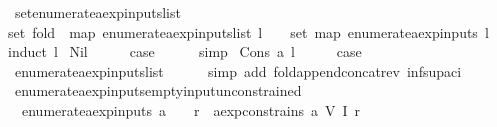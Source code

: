 \begin{isabellebody}
%
\isadelimproof
\isanewline
%
\endisadelimproof
\isanewline
{}\isamarkupfalse%
\ set{\isacharunderscore}enumerate{\isacharunderscore}aexp{\isacharunderscore}inputs{\isacharunderscore}list{\isacharcolon}\ \isanewline
{\isachardoublequoteopen}set\ {\isacharparenleft}fold\ {\isacharparenleft}{\isacharat}{\isacharparenright}\ {\isacharparenleft}map\ enumerate{\isacharunderscore}aexp{\isacharunderscore}inputs{\isacharunderscore}list\ l{\isacharparenright}\ {\isacharbrackleft}{\isacharbrackright}{\isacharparenright}\ {\isacharequal}\ {\isacharparenleft}{\isasymUnion}\ {\isacharparenleft}set\ {\isacharparenleft}map\ enumerate{\isacharunderscore}aexp{\isacharunderscore}inputs\ l{\isacharparenright}{\isacharparenright}{\isacharparenright}{\isachardoublequoteclose}\isanewline
%
\isadelimproof
%
\endisadelimproof
%
\isatagproof
{}\isamarkupfalse%
{\isacharparenleft}induct\ l{\isacharparenright}\isanewline
{}\isamarkupfalse%
\ Nil\isanewline
\ \ \isamarkupfalse%
\ \isamarkupfalse%
\ {\isacharquery}case\isanewline
\ \ \ \ \isamarkupfalse%
\ simp\isanewline
{}\isamarkupfalse%
\isanewline
{}\isamarkupfalse%
\ {\isacharparenleft}Cons\ a\ l{\isacharparenright}\isanewline
\ \ \isamarkupfalse%
\ \isamarkupfalse%
\ {\isacharquery}case\isanewline
\ \ \ \ \isamarkupfalse%
\ enumerate{\isacharunderscore}aexp{\isacharunderscore}inputs{\isacharunderscore}list\isanewline
\ \ \ \ \isamarkupfalse%
\ {\isacharparenleft}simp\ add{\isacharcolon}\ fold{\isacharunderscore}append{\isacharunderscore}concat{\isacharunderscore}rev\ inf{\isacharunderscore}sup{\isacharunderscore}aci{\isacharparenleft}{}{\isacharparenright}{\isacharparenright}\isanewline
{}\isamarkupfalse%
%
\endisatagproof
{\isafoldproof}%
%
\isadelimproof
\isanewline
%
\endisadelimproof
\isanewline
{}\isamarkupfalse%
\ enumerate{\isacharunderscore}aexp{\isacharunderscore}inputs{\isacharunderscore}empty{\isacharunderscore}input{\isacharunderscore}unconstrained{\isacharcolon}\isanewline
\ \ {\isachardoublequoteopen}enumerate{\isacharunderscore}aexp{\isacharunderscore}inputs\ a\ {\isacharequal}\ {\isacharbraceleft}{\isacharbraceright}\ {\isasymLongrightarrow}\ {\isasymforall}r{\isachardot}\ {\isasymnot}\ aexp{\isacharunderscore}constrains\ a\ {\isacharparenleft}V\ {\isacharparenleft}I\ r{\isacharparenright}{\isacharparenright}{\isachardoublequoteclose}\isanewline
%
\isadelimproof
%
\endisadelimproof

\end{isabellebody}
